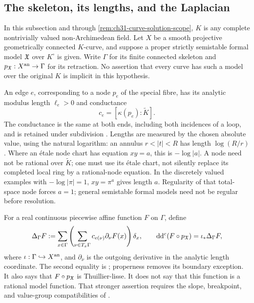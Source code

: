 
\subsection{The skeleton, its lengths, and the Laplacian}
\label{sec:ch31-curve-setup}

In this subsection and through \cref{rem:ch31-curve-solution-scope},
\(K\) is any complete nontrivially valued non-Archimedean field.
Let \(X\) be a smooth projective geometrically connected \(K\)-curve,
and suppose a proper strictly semistable formal model \(\mathfrak X\) over
\(K^\circ\) is given.  Write \(\Gamma\) for its finite connected
skeleton and \(p_{\mathfrak X}:X^{\mathrm{an}}\to\Gamma\) for its retraction.
No assertion that every curve has such a model over the original
\(K\) is implicit in this hypothesis.

An edge \(e\), corresponding to a node \(p_e\) of the special fibre,
has its analytic modulus length \(\ell_e>0\) and conductance
\[
                    c_e=[\kappa(p_e):\widetilde K].
\]
The conductance is the same at both ends, including both incidences
of a loop, and is retained under subdivision
\cite[\S2.2.3, p.~41]{Thu05}.
Lengths are measured by the chosen absolute value, using the natural
logarithm: an annulus \(r<|t|<R\) has length \(\log(R/r)\).
Where an \'{e}tale node chart has equation \(xy=a\), this is
\(-\log|a|\).  A node need not be rational over \(\widetilde K\);
one must use its \'{e}tale chart, not silently replace its completed
local ring by a rational-node equation.  In the discretely valued
examples with \(-\log|\pi|=1\), \(xy=\pi^a\) gives length \(a\).
Regularity of that total-space node forces \(a=1\); general
semistable formal models need not be regular before resolution.

For a real continuous piecewise affine function \(F\) on \(\Gamma\),
define
\begin{equation}
\label{eq:ch31-graph-laplacian}
 \Delta_\Gamma F
   :=\sum_{x\in\Gamma}
       \left(\sum_{\nu\in T_x\Gamma}
              c_{e(\nu)}\partial_\nu F(x)\right)\delta_x,
 \qquad
 \mathrm d\mathrm d^c(F\circ p_{\mathfrak X})=\iota_*\Delta_\Gamma F ,
\end{equation}
where \(\iota:\Gamma\hookrightarrow X^{\mathrm{an}}\), and
\(\partial_\nu\) is the outgoing derivative in the analytic length
coordinate.  The second equality is
\cite[Theorem~3.2.10(ii)]{Thu05}; properness removes its boundary
exception.  It also says that \(F\circ p_{\mathfrak X}\) is Thuillier-lisse.
It does not say that this function is a rational model function.
That stronger assertion requires the slope, breakpoint, and value-group
compatibilities of \cite[Proposition~3.5]{GJKM19}.

